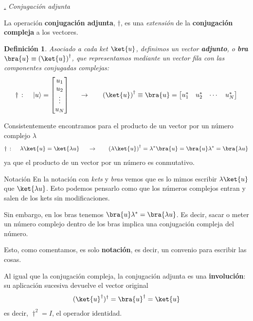 \documentclass[a4paper,11pt]{book} %
\newtheorem{definicion_contador}{Definición}
\newcommand{\Definicion}[1]{
		\begin{mybox_gray2}{}
			\begin{definicion_contador}
				 #1 
			\end{definicion_contador} 
		\end{mybox_gray2}
	}
\numberwithin{equation}{chapter}
\def\subsubiContadorIt{\par\addtocounter{subsubsection}{1}\underline{\it\thesubsubsection.}\hskip0.5cm \setcounter{subsubsubsectionIt}{0}}
\newcommand{\SubsubiIt}[1]{
		\subsubiContadorIt \textit{#1}
	}
\newcounter{subsubsubsectionIt}[subsubsection]
\begin{document}
		\SubsubiIt{Conjugación adjunta}
		
La operación \textbf{conjugación adjunta},  $\dagger$, es una \textit{extensión} de la \textbf{conjugación compleja}  a los vectores.

	\Definicion{Asociado a cada \textit{ket }$\ket{u}$, definimos un vector \textbf{adjunto}, o \textbf{bra} $\bra{u}\equiv\left(\ket{u}\right)^\dagger$,  que representamos mediante un vector fila con las componentes conjugadas complejas:  
		\begin{equation}
\dagger \,: \quad\,|u\rangle = \begin{bmatrix} {u_1}\\ {u_2}\\ \vdots \\ {u_N} \end{bmatrix} 
~~~~~{\rightarrow}~~~~~~ \left(\ket{u}\right)^\dagger \equiv \bra{u} =\begin{bmatrix} {u_1^*} & {u_2^*} & \cdots & {u_N^*}
\end{bmatrix}
		\end{equation}
	}

Consistentemente encontramos para el producto de un vector por un número complejo $\lambda$
	\begin{equation}
	\dagger \,:\quad\,  \lambda\ket{u}=\ket{\lambda u} ~~~~~{\rightarrow}~~~~~~ \left(\lambda\ket{u}\right)^\dagger=\lambda^*\bra{u} = \bra{u}\lambda^* = \bra{\lambda u}
	\end{equation}
ya que el producto de un vector por un número es conmutativo.		
		
	\begin{mybox_blue}{Notación}
	En la notación con \textit{kets} y \textit{bras} vemos que es lo mimos escribir $\lambda\ket{u}$ que $\ket{\lambda u}$. Esto podemos pensarlo como que los números complejos entran y salen de los kets sin modificaciones. 
	\vspace{0.3cm}
	
	Sin embargo, en los bras tenemos $\bra{u}\lambda^* = \bra{\lambda u}$. Es decir, sacar o meter un número complejo dentro de los bras implica una conjugación compleja del número. 
	\vspace{0.3cm}
	
	Esto, como comentamos, es solo \textbf{notación}, es decir, un convenio para escribir las cosas.
	\end{mybox_blue}
		
Al igual que la conjugación compleja, la conjugación adjunta es una \textbf{involución}: su aplicación sucesiva devuelve el vector original
$$
(\ket{u}^\dagger)^\dagger =\bra{u}^\dagger =  \ket{u}
$$
es decir, $\dagger^2 = I$, el operador identidad.		
		
\end{document}
